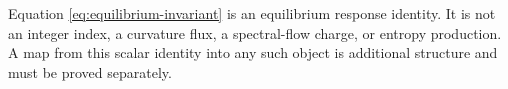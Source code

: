 \begin{remark}
Equation \eqref{eq:equilibrium-invariant} is an equilibrium response identity.  It is not an integer index, a curvature flux, a spectral-flow charge, or entropy production.  A map from this scalar identity into any such object is additional structure and must be proved separately.
\end{remark}
